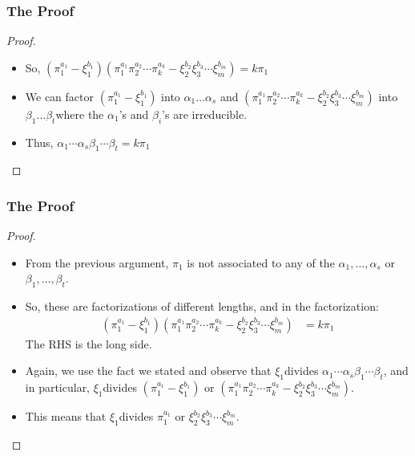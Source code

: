 \begin{frame}
  \frametitle{The Proof}
  \begin{proof}
    \begin{itemize}
      \item<1-> So, $(\pi_{1}^{a_{1}}-\xi_{1}^{b_{1}})(\pi_{1}^{a_{1}}\pi_{2}^{a_{2}}\cdots\pi_{k}^{a_{k}}-\xi_{2}^{b_{2}}\xi_{3}^{b_{3}}\cdots\xi_{m}^{b_{m}})=k\pi_{1}$
      \item<2-> We can factor $(\pi_{1}^{a_{1}}-\xi_{1}^{b_{1}})$ into $\alpha_{1}\ldots\alpha_{s}$ and $(\pi_{1}^{a_{1}}\pi_{2}^{a_{2}}\cdots\pi_{k}^{a_{k}}-\xi_{2}^{b_{2}}\xi_{3}^{b_{3}}\cdots\xi_{m}^{b_{m}})$ into $\beta_{1}\ldots\beta_{t}$where the $\alpha_{1}$'s and $\beta_{i}$'s are irreducible. 
      \item<3-> Thus, $\alpha_{1}\cdots\alpha_{s}$$\beta_{1}\cdots\beta_{t}=k\pi_{1}$ 
    \end{itemize}
    \noqedsymbol
  \end{proof}
\end{frame}

\begin{frame}
  \frametitle{The Proof}
  \begin{proof}
    \begin{itemize}
      \item<1-> From the previous argument, $\pi_{1}$ is not associated to any of the $\alpha_{1},\ldots,\alpha_{s}$ or $\beta_{1},\ldots,\beta_{t}$. 
      \item<2-> So, these are factorizations of different lengths, and in the factorization:
	\begin{align*}
	  (\pi_{1}^{a_{1}}-\xi_{1}^{b_{1}})(\pi_{1}^{a_{1}}\pi_{2}^{a_{2}}\cdots\pi_{k}^{a_{k}}-\xi_{2}^{b_{2}}\xi_{3}^{b_{3}}\cdots\xi_{m}^{b_{m}}) & =k\pi_{1}
	\end{align*}
	The RHS is the long side. 
      \item<3-> Again, we use the fact we stated and observe that $\xi_{1}$divides $\alpha_{1}\cdots\alpha_{s}$$\beta_{1}\cdots\beta_{t}$, and in particular, $\xi_{1}$divides $(\pi_{1}^{a_{1}}-\xi_{1}^{b_{1}})$ or $(\pi_{1}^{a_{1}}\pi_{2}^{a_{2}}\cdots\pi_{k}^{a_{k}}-\xi_{2}^{b_{2}}\xi_{3}^{b_{3}}\cdots\xi_{m}^{b_{m}}).$
      \item<4-> This means that $\xi_{1}$divides $\pi_{1}^{a_{1}}$ or $\xi_{2}^{b_{2}}\xi_{3}^{b_{3}}\cdots\xi_{m}^{b_{m}}$.
    \end{itemize}
    \noqedsymbol
  \end{proof}
\end{frame}

